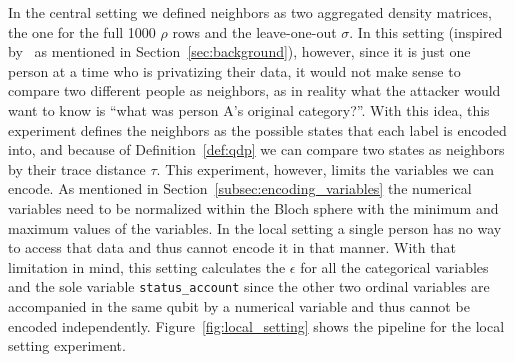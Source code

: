 \documentclass{ieeeaccess}
\begin{document}
In the central setting we defined neighbors as two aggregated density matrices, the one for the full 1000 $\rho$ rows and the leave-one-out $\sigma$. In this setting (inspired by~\cite[Def.~12.1]{dwork2014algorithmic} as mentioned in Section~\ref{sec:background}), however, since it is just one person at a time who is privatizing their data, it would not make sense to compare two different people as neighbors, as in reality what the attacker would want to know is ``what was person A's original category?''. With this idea, this experiment defines the neighbors as the possible states that each label is encoded into, and because of Definition~\ref{def:qdp} we can compare two states as neighbors by their trace distance $\tau$. This experiment, however, limits the variables we can encode. As mentioned in Section~\ref{subsec:encoding_variables} the numerical variables need to be normalized within the Bloch sphere with the minimum and maximum values of the variables. In the local setting a single person has no way to access that data and thus cannot encode it in that manner. With that limitation in mind, this setting calculates the $\epsilon$ for all the categorical variables and the sole variable \texttt{status\_account} since the other two ordinal variables are accompanied in the same qubit by a numerical variable and thus cannot be encoded independently. Figure~\ref{fig:local_setting} shows the pipeline for the local setting experiment.
\end{document}
